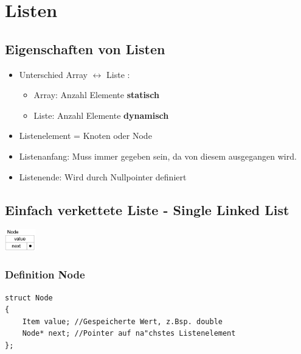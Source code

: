 \section{Listen}
\subsection{Eigenschaften von Listen}
\begin{itemize}
  \item Unterschied Array $\leftrightarrow$ Liste :
  	\begin{itemize}
	  	\item Array: Anzahl Elemente \textbf{statisch} 
	  	\item Liste: Anzahl Elemente \textbf{dynamisch}
  	\end{itemize}
  \item Listenelement = Knoten oder Node
  \item Listenanfang: Muss immer gegeben sein, da von diesem ausgegangen wird. 
  \item Listenende: Wird durch Nullpointer definiert
\end{itemize}



\subsection{Einfach verkettete Liste - Single Linked List}
\begin{flushleft}
{\includegraphics[width=0.1\textwidth]{images/Listen/SLL.png}}
\label{Fig: Single Linked List}
\end{flushleft}
\subsubsection{Definition Node}
\begin{lstlisting}[style=C]
struct Node
{
	Item value; //Gespeicherte Wert, z.Bsp. double
	Node* next; //Pointer auf na"chstes Listenelement
};
\end{lstlisting}

